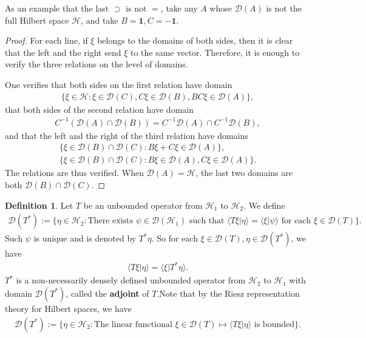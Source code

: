 \documentclass[12pt,a4paper,notitlepage]{article}
\theoremstyle{definition}
\newtheorem{df}{Definition}[section]
\theoremstyle{plain}
\newcommand{\mc}{\mathcal}
\newcommand{\id}{\mathbf{1}}
\newcommand{\Dom}{\scr D}
\newcommand{\bk}[1]{\langle {#1}\rangle}
\newcommand{\scr}{\mathscr}
\numberwithin{equation}{section}
\begin{document}
As an example that the last $\supset$ is not $=$, take any $A$ whose $\Dom(A)$ is not the full Hilbert space $\mc H$, and take $B=\id,C=-\id$.

\begin{proof}
For each line, if $\xi$ belongs to the domains of both sides, then it is clear that the left and the right send $\xi$ to the same vector. Therefore, it is enough to verify the three relations on the level of domains.

One verifies that both sides on the first relation have domain
\begin{align*}
	\{\xi\in\mc H:\xi\in\Dom(C),C\xi\in\Dom(B),BC\xi\in\Dom(A)\},
\end{align*}
that both sides of the second relation have domain
\begin{align*}
C^{-1}(\Dom(A)\cap\Dom(B))=C^{-1}\Dom(A)\cap C^{-1}\Dom(B),
\end{align*}
and that the left and the right of the third relation have domains
\begin{gather*}
\{\xi\in\Dom(B)\cap\Dom(C):B\xi+C\xi\in\Dom(A)\},\\
\{\xi\in\Dom(B)\cap\Dom(C):B\xi\in\Dom(A),C\xi\in\Dom(A)\}.	
\end{gather*}
The relations are thus verified. When $\scr D(A)=\mc H$, the last two domains are both $\scr D(B)\cap\scr D(C)$.
\end{proof}

\begin{df}
Let $T$ be an unbounded operator from $\mc H_1$ to $\mc H_2$. We define
\begin{align*}
\Dom(T^*):=\{\eta\in\mc H_2:\text{There exists $\psi\in\Dom(\mc H_1)$ such that $\bk{T\xi|\eta}=\bk{\xi|\psi}$ for each $\xi\in\Dom(T)$}\}.	
\end{align*}
Such $\psi$ is unique and is denoted by $T^*\eta$. So for each $\xi\in\Dom(T),\eta\in\Dom(T^*)$, we have
\begin{align*}
	\bk{T\xi|\eta}=\bk{\xi|T^*\eta}.
\end{align*}
$T^*$ is a non-necessarily densely defined unbounded operator from $\mc H_2$ to $\mc H_1$ with domain $\Dom(T^*)$, called the \textbf{adjoint} of $T$.Note that by the Riesz representation theory for Hilbert spaces, we have
\begin{align}
\Dom(T^*):=\{\eta\in\mc H_2:\text{The linear functional $\xi\in\Dom(T)\mapsto \bk{T\xi|\eta}$ is bounded}\}.\label{eq21}
\end{align}
\end{df}
\end{document}
